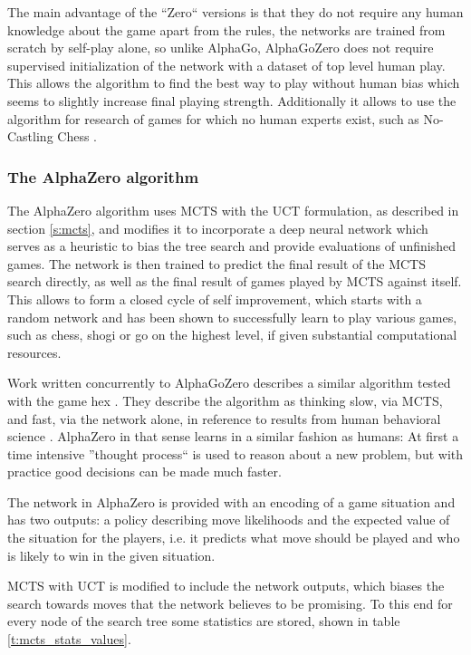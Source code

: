 \documentclass[12pt,onecolumn,oneside,titlepage]{article}
\begin{document}
The main advantage of the ``Zero`` versions is that they do not require any human knowledge about the game apart from the rules, the networks are trained from scratch by self-play alone, so unlike AlphaGo, AlphaGoZero does not require supervised initialization 
of the network with a dataset of top level human play. This allows the algorithm to find the best way to play without human bias which seems to slightly increase final playing strength.
Additionally it allows to use the algorithm for research of games for which no human experts exist, such as No-Castling Chess \cite{NoCastleChess}.

\subsubsection{The AlphaZero algorithm}
\label{s:azalgo}

The AlphaZero algorithm \cite{silver2018general} uses MCTS with the UCT formulation, as described in section \ref{s:mcts}, and modifies it to incorporate a deep neural network which serves as a heuristic to bias the tree search and provide evaluations of unfinished games.
The network is then trained to predict the final result of the MCTS search directly, as well as the final result of games played by MCTS against itself.
This allows to form a closed cycle of self improvement, which starts with a random network and has been shown to successfully learn to play various games, such as chess, shogi or go on the highest level, if given substantial computational resources.

Work written concurrently to AlphaGoZero describes a similar algorithm tested with the game hex \cite{anthony2017thinking}. They describe the algorithm as thinking slow, via MCTS, and fast, via the network alone, in reference to results from human behavioral science \cite{kahneman2011thinking}.
AlphaZero in that sense learns in a similar fashion as humans: At first a time intensive ''thought process`` is used to reason about a new problem, but with practice good decisions can be made much faster.

The network in AlphaZero is provided with an encoding of a game situation and has two outputs: a policy describing move likelihoods and the expected value of the situation for the players, i.e. it predicts what move should be played and who is likely to win in the given situation.

MCTS with UCT is modified to include the network outputs, which biases the search towards moves that the network believes to be promising.
To this end for every node of the search tree some statistics are stored, shown in table \ref{t:mcts_stats_values}.
\end{document}
